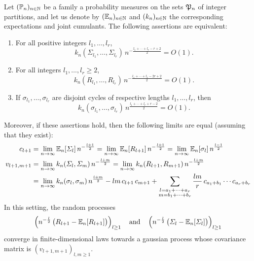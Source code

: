 \documentclass[10pt]{amsart}
\begin{document}
\begin{theorem}\label{sniadytheo}
Let $(\mathbb{P}_{n})_{n \in \mathbb{N}}$ be a family a probability measures on the sets $\mathfrak{P}_{n}$ of integer partitions, and let us denote by $(\mathbb{E}_{n})_{n \in \mathbb{N}}$ and $(k_{n})_{n \in \mathbb{N}}$ the corresponding expectations and joint cumulants. The following assertions are equivalent:
\begin{enumerate}
\item For all positive integers $l_{1},\ldots,l_{r}$, 
$$k_{n}(\varSigma_{l_{1}},\ldots,\varSigma_{l_{r}})\,n^{-\frac{l_{1}+\cdots+l_{r}-r+2}{2}}=O(1).$$
\item For all integers $l_{1},\ldots,l_{r} \geq 2$,
$$k_{n}(R_{l_{1}},\ldots,R_{l_{r}})\,n^{-\frac{l_{1}+\cdots+l_{r}-2r+2}{2}}=O(1).$$
\item If $\sigma_{l_{1}}, \ldots,\sigma_{l_{r}}$ are disjoint cycles of respective lengths $l_{1},\ldots,l_{r}$, then $$k_{n}(\sigma_{l_{1}},\ldots,\sigma_{l_{r}})\,n^{\frac{l_{1}+\cdots+l_{r}+r-2}{2}}=O(1).$$
\end{enumerate}
Moreover, if these assertions hold, then the following limits are equal (assuming that they exist):
\begin{align*}c_{l+1}&=\lim_{n\to \infty} \mathbb{E}_{n}[\varSigma_{l}]\,n^{-\frac{l+1}{2}}=\lim_{n\to \infty} \mathbb{E}_{n}[R_{l+1}]\,n^{-\frac{l+1}{2}}=\lim_{n \to \infty} \mathbb{E}_{n}[\sigma_{l}]\,n^{\frac{l-1}{2}}\\
v_{l+1,m+1}&=\lim_{n \to \infty}k_{n}(\varSigma_{l},\varSigma_{m})\,n^{-\frac{l+m}{2}}=\lim_{n \to \infty}k_{n}(R_{l+1},R_{m+1})\,n^{-\frac{l+m}{2}}\\
&=\lim_{n \to \infty}k_{n}(\sigma_{l},\sigma_{m})\,n^{\frac{l+m}{2}}-lm\,c_{l+1}\,c_{m+1}+\sum_{\substack{l=a_{1}+\cdots+a_{r}\\ m=b_{1}+\cdots + b_{r}}} \frac{lm}{r}\,c_{a_{1}+b_{1}}\cdots c_{a_{r}+b_{r}}
\end{align*} 
In this setting, the random processes
$$\left(n^{-\frac{l}{2}}\,\big(R_{l+1}-\mathbb{E}_{n}[R_{l+1}]\big)\right)_{l\geq 1}\quad\text{and}\quad\left(n^{-\frac{l}{2}}\,\big({\varSigma_{l}}-\mathbb{E}_{n}[\varSigma_{l}]\big)\right)_{l\geq 1}$$
converge in finite-dimensional laws towards a gaussian process whose covariance matrix is $(v_{l+1,m+1})_{l,m \geq 1}$.
\end{theorem}
\bigskip
\end{document}
